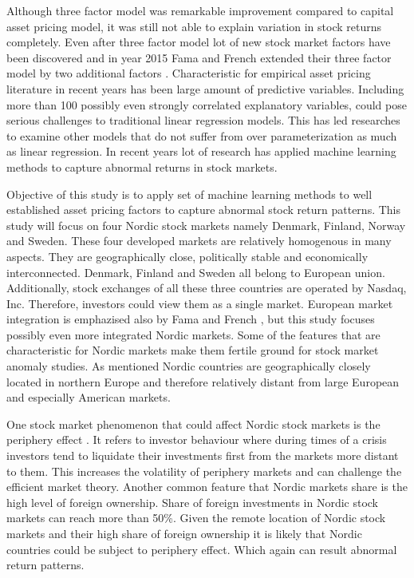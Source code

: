 \documentclass{article}
\begin{document}
Although three factor model was remarkable improvement compared to capital asset pricing model, it was still not able to explain variation in stock returns completely. Even after three factor model lot of new stock market factors have been discovered and in year 2015 Fama and French extended their three factor model by two additional factors \cite{FAMA20151}. Characteristic for empirical asset pricing literature in recent years has been large amount of predictive variables. Including more than 100 possibly even strongly correlated explanatory variables, could pose serious challenges to traditional linear regression models. This has led researches to examine other models that do not suffer from over parameterization as much as linear regression. In recent years lot of research has applied machine learning methods to capture abnormal returns in stock markets.  \par

Objective of this study is to apply set of machine learning methods to well established asset pricing factors to capture abnormal stock return patterns. This study will focus on four Nordic stock markets namely Denmark, Finland, Norway and Sweden. These four developed markets are relatively homogenous in many aspects. They are geographically close, politically stable and economically interconnected. Denmark, Finland and Sweden all belong to European union. Additionally, stock exchanges of all these three countries are operated by Nasdaq, Inc. Therefore, investors could view them as a single market. European market integration is emphazised also by Fama and French \citeyear{FAMA2012457}, but this study focuses possibly even more integrated Nordic markets. Some of the features that are characteristic for Nordic markets make them fertile ground for stock market anomaly studies. As mentioned Nordic countries are geographically closely located in northern Europe and therefore relatively distant from large European and especially American markets.  \par

One stock market phenomenon that could affect Nordic stock markets is the periphery effect \cite{leivo2011}. It refers to investor behaviour where during times of a crisis investors tend to liquidate their investments first from the markets more distant to them. This increases the volatility of periphery markets and can challenge the efficient market theory. Another common feature that Nordic markets share is the high level of foreign ownership. Share of foreign investments in Nordic stock markets can reach more than 50\%\footnotemark. Given the remote location of Nordic stock markets and their high share of foreign ownership it is likely that Nordic countries could be subject to periphery effect. Which again can result abnormal return patterns. \par
\end{document}
